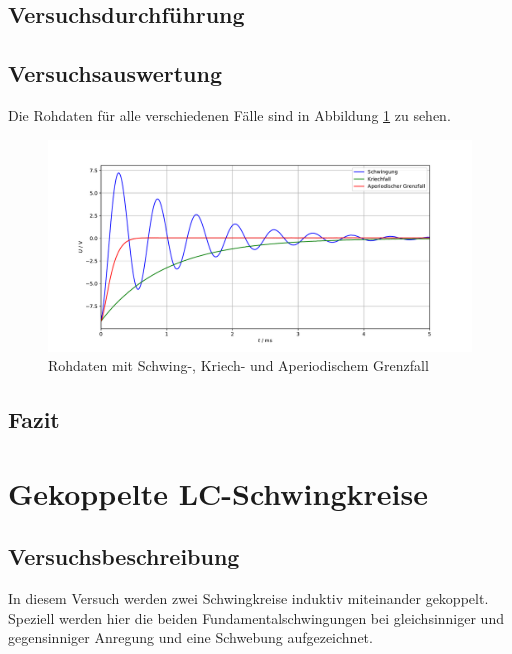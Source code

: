 \documentclass[a4paper, 12pt]{scrartcl}
\begin{document}
\subsection{Versuchsdurchführung}



\subsection{Versuchsauswertung}

Die Rohdaten für alle verschiedenen Fälle sind in Abbildung \ref{abb:rohdaten_ska} zu sehen.

\begin{figure}[H]
\centering
\includegraphics[width=\textwidth]{plots/rohdaten_ska.pdf}
\caption{Rohdaten mit Schwing-, Kriech- und Aperiodischem Grenzfall}
\label{abb:rohdaten_ska}
\end{figure}


\subsection{Fazit}




\section{Gekoppelte LC-Schwingkreise}


\subsection{Versuchsbeschreibung}

In diesem Versuch werden zwei Schwingkreise induktiv miteinander gekoppelt. Speziell werden hier die beiden Fundamentalschwingungen bei gleichsinniger und gegensinniger Anregung und eine Schwebung aufgezeichnet.
\end{document}
